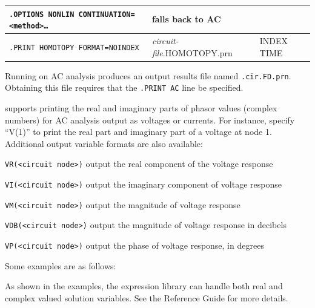 \begin{table}[htbp]
\begin{tabularx}{\linewidth}{|p{2.75in}|Y|Y|}
\texttt{.OPTIONS NONLIN CONTINUATION=<method>\ldots} & falls back to AC & \\ \hline
\texttt{.PRINT HOMOTOPY FORMAT=NOINDEX} & \emph{circuit-file}.HOMOTOPY.prn & INDEX TIME \\ \hline

  \end{tabularx}
\end{table}


\label{AC_print}

Running \Xyce{} on AC analysis produces an output results file named
\verb|.cir.FD.prn|. Obtaining this file requires that the
\verb|.PRINT AC| line be specified.

\Xyce{} supports printing the real and imaginary parts of phasor
values (complex numbers) for AC analysis output as voltages or
currents. For instance, specify ``V(1)'' to print the real part and
imaginary part of a voltage at node 1. Additional output variable
formats are also available:
\begin{XyceItemize}
\item \texttt{VR(<circuit node>)} output the real component of the voltage response
\item \texttt{VI(<circuit node>)} output the imaginary component of voltage response
\item \texttt{VM(<circuit node>)} output the magnitude of voltage response
\item \texttt{VDB(<circuit node>)} output the magnitude of voltage response in decibels
\item \texttt{VP(<circuit node>)} output the phase of voltage response, in degrees
\end{XyceItemize}

Some examples are as follows: 

As shown in the examples, the expression library can handle both real and complex valued solution variables.
See the \Xyce{} Reference Guide\ReferenceGuide{} for more details.


